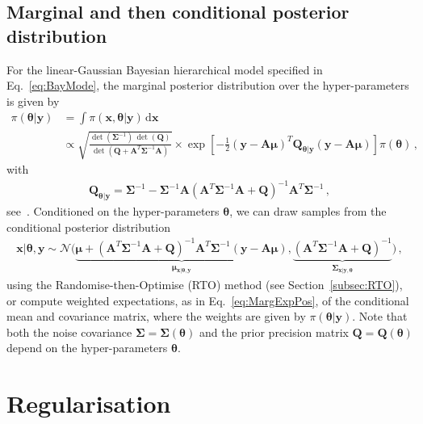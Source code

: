 \subsection{Marginal and then conditional posterior distribution}
\label{subsec:MTC}

For the linear-Gaussian Bayesian hierarchical model specified in Eq.~\ref{eq:BayMode}, the marginal posterior distribution over the hyper-parameters is given by
\begin{align}
	\pi(\bm{\theta} |  \bm{y}) &= \int \pi(\bm{x}, \bm{\theta} | \bm{y}) \, \mathrm{d} \bm{x} \\ 
	\label{eq:condHyper}
	&\propto \sqrt{ \frac{ \det( \bm{\Sigma}^{-1} ) \,  \det( \bm{Q} ) }{\det( \bm{Q} + \bm{A}^T \bm{\Sigma}^{-1} \bm{A} ) } } \times \exp \left[ - \frac{1}{2}(\bm{y} - \bm{A} \bm{\mu})^T \bm{Q}_{\bm{\theta |  y}} (\bm{y} - \bm{A} \bm{\mu}) \right] \pi(\bm{\theta}) \, ,
\end{align}
with
\begin{align}
	\bm{Q}_{\bm{\theta |  y}} = \bm{\Sigma}^{-1} - \bm{\Sigma}^{-1} \bm{A} \left( \bm{A}^T \bm{\Sigma}^{-1} \bm{A} + \bm{Q} \right)^{-1} \bm{A}^T \bm{\Sigma}^{-1} \, ,
\end{align}
see~\cite[Lemma 2]{fox2016fast}. 
Conditioned on the hyper-parameters $\bm{\theta}$, we can draw samples from the conditional posterior distribution
\begin{align}
	\bm{x} |  \bm{\theta}, \bm{y} \sim \mathcal{N} \Big(
	\underbrace{\bm{\mu} + \left( \bm{A}^T \bm{\Sigma}^{-1} \bm{A} + \bm{Q} \right)^{-1} \bm{A}^T \bm{\Sigma}^{-1} (\bm{y} - \bm{A} \bm{\mu})}_{\bm{\mu}_{\bm{x} |  \bm{\theta}, \bm{y}}},
	\underbrace{ \left( \bm{A}^T \bm{\Sigma}^{-1} \bm{A} + \bm{Q} \right)^{-1} }_{\bm{\Sigma}_{\bm{x} |  \bm{y}, \bm{\theta}}}
	\Big) \, ,
\end{align}
using the Randomise-then-Optimise (RTO) method (see Section~\ref{subsec:RTO}), or compute weighted expectations, as in Eq.~\ref{eq:MargExpPos}, of the conditional mean and covariance matrix, where the weights are given by $\pi(\bm{\theta} |  \bm{y})$. 
Note that both the noise covariance $\bm{\Sigma} = \bm{\Sigma}(\bm{\theta})$ and the prior precision matrix $\bm{Q} = \bm{Q}(\bm{\theta})$ depend on the hyper-parameters $\bm{\theta}$.

\section{Regularisation}
\label{sec:regularise}

